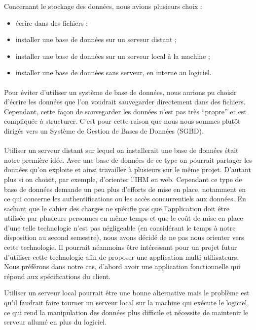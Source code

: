 Concernant le stockage des données, nous avions plusieurs choix :
\begin{itemize}
\item écrire dans des fichiers ;
\item installer une base de données sur un serveur distant ;
\item installer une base de données sur un serveur local à la machine ;
\item installer une base de données sans serveur, en interne au logiciel.
\end{itemize}

\paragraph{}
Pour éviter d’utiliser un système de base de données, nous aurions pu choisir
d’écrire les données que l’on voudrait sauvegarder directement dans des
fichiers. Cependant, cette façon de sauvegarder les données n’est pas très
“propre” et est compliquée à structurer. C’est pour cette raison que nous nous
sommes plutôt dirigés vers un Système de Gestion de Bases de Données (SGBD).

\paragraph{}
Utiliser un serveur distant sur lequel on installerait une base de données 
était notre première idée. Avec une base de données de ce type on pourrait 
partager les données qu’on exploite et ainsi travailler à plusieurs sur le 
même projet. D’autant plus si on choisit, par exemple, d’orienter l’IHM en
 web. Cependant ce type de base de données demande un peu plus d’efforts 
de mise en place, notamment en ce qui concerne les authentifications ou 
les accès concurrentiels aux données. En sachant que le cahier des charges 
ne spécifie pas que l’application doit être utilisée par plusieurs personnes 
en même temps et que le coût de mise en place d’une telle technologie n’est 
pas négligeable (en considérant le temps à notre disposition au second 
semestre), nous avons décidé de ne pas nous orienter vers cette technologie. 
Il pourrait néanmoins être intéressant pour un projet futur d’utiliser 
cette technologie afin de proposer une application multi-utilisateurs. 
Nous préférons dans notre cas, d’abord avoir une application fonctionnelle 
qui répond aux spécifications du client. 

 Utiliser un serveur local pourrait être une bonne alternative mais le problème 
est qu’il faudrait faire tourner un serveur local sur la machine qui exécute 
le logiciel, ce qui rend la manipulation des données plus difficile et
 nécessite de maintenir le serveur allumé en plus du logiciel.

